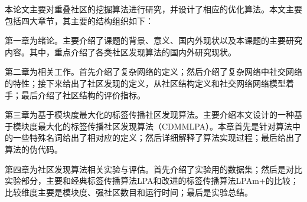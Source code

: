 本论文主要对重叠社区的挖掘算法进行研究，并设计了相应的优化算法。本文主要包括四大章节，其主要的结构组织如下：

第一章为绪论。主要介绍了课题的背景、意义、国内外现状以及本课题的主要研究内容。其中，重点介绍了各类社区发现算法的国内外研究现状。

第二章为相关工作。首先介绍了复杂网络的定义；然后介绍了复杂网络中社交网络的特性；接下来给出了社区发现的定义，从社区结构定义和社交网络网络模型着手；最后介绍了社区结构的评价指标。

第三章为基于模块度最大化的标签传播社区发现算法。主要介绍本文设计的一种基于模块度最大化的标签传播社区发现算法（CDMMLPA）。本章首先是针对算法中的一些特殊名词给出了相对应的定义；然后详细解释了算法实现过程；最后给出了算法的伪代码。

第四章为社区发现算法相关实验与评估。首先介绍了实验用的数据集；然后是对比实验部分，主要和经典标签传播算法LPA和改进的标签传播算法LPAm+的比较；比较维度主要是模块度、强社区数目和运行时间；最后是实验总结。
